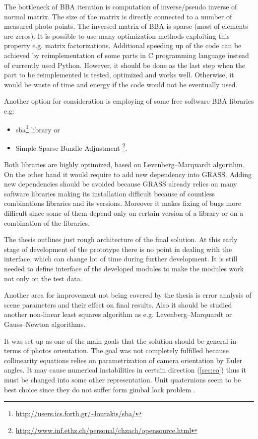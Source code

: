 \documentclass[a4paper,12pt]{article}
\begin{document}
The bottleneck of BBA iteration is computation of inverse/pseudo inverse of normal matrix.
The size of the matrix is directly connected to a number of measured photo points.
The inversed matrix of BBA is sparse (most of elements are zeros).
It is possible to use many optimization methods exploiting this property e.g. matrix factorizations. 
Additional speeding up of the code can be achieved by reimplementation of some parts in C programming language 
instead of currently used Python. However, it should be done 
as the last step when the part to be reimplemented is tested, optimized and works well. Otherwise, it would be waste of time and energy if the 
code would not be eventually used. 


Another option  for consideration is employing of some free software BBA libraries e.g:
\begin{itemize}
\item sba\footnote{\url{http://users.ics.forth.gr/~lourakis/sba/}} library or 
\item Simple Sparse Bundle Adjustment \footnote{\url{http://www.inf.ethz.ch/personal/chzach/opensource.html}}.
\end{itemize}

Both libraries are highly optimized, based on Levenberg–Marquardt algorithm.
On the other hand it would require to add new dependency into GRASS. 
Adding new dependencies should be avoided because GRASS already relies on many software libraries
 making its installation difficult because of countless combinations libraries and its versions.
 Moreover it makes fixing of bugs more difficult since some of them
 depend only on certain version of  a library or on a combination of the libraries. 
 
The thesis outlines just rough architecture of the final solution. At this early stage of development of the
prototype
there is no point in dealing with the interface, which can change lot of time during further development.
It is still needed to define interface of the developed modules to make the modules work not only on the test data. 

Another area for improvement not being covered by the thesis is error analysis of scene parameters and their 
effect on final results. Also it should be studied another non-linear least squares algorithm as e.g. Levenberg–Marquardt or 
Gauss–Newton  algorithms. 

It was set up as one of the main goals that the solution should be general in terms of photos orientation.
The goal was not completely fulfilled because collinearity equations relies on parametrization of camera orientation by Euler angles.
It may cause numerical instabilities in certain direction (\ref{sec:eo}) thus it must be changed into some other representation.
Unit quaternions seem to be best choice since they do not suffer form gimbal lock problem \cite{schmidt2001using}.
\end{document}
